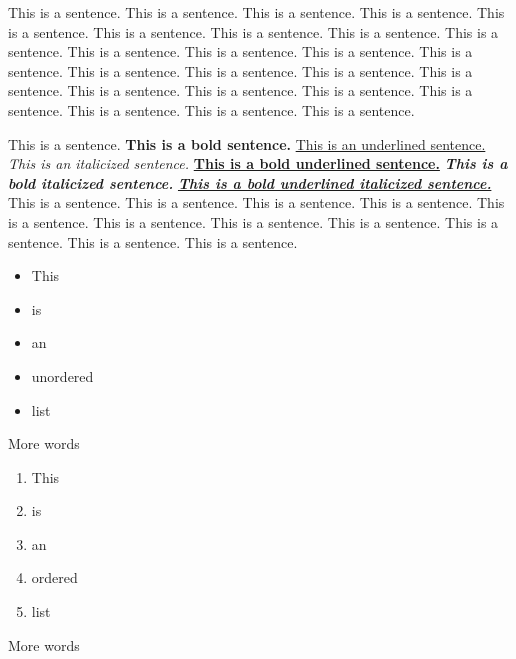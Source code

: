 

This is a sentence. This is a sentence. This is a sentence. This is a sentence. This is a sentence. This is a sentence. This is a sentence. This is a sentence. This is a sentence. This is a sentence. This is a sentence. This is a sentence. This is a sentence. This is a sentence. This is a sentence. This is a sentence. This is a sentence. This is a sentence. This is a sentence. This is a sentence. This is a sentence. This is a sentence. This is a sentence. This is a sentence.

\underline{}


This is a sentence. \textbf{This is a bold sentence.} \underline{This is an underlined sentence.} \textit{This is an italicized sentence.} \underline{\textbf{This is a bold underlined sentence.}}\textbf{ }\textit{\textbf{This is a bold italicized sentence.}} \underline{\textit{\textbf{This is a bold underlined italicized sentence.}}} This is a sentence. This is a sentence. This is a sentence. This is a sentence. This is a sentence. This is a sentence. This is a sentence. This is a sentence. This is a sentence. This is a sentence. This is a sentence.

\begin{itemize}
  \item This
  \item is
  \item an
  \item unordered
  \item list
\end{itemize}

More words

\begin{enumerate}
  \item This
  \item is
  \item an
  \item ordered
  \item list
\end{enumerate}

More words

